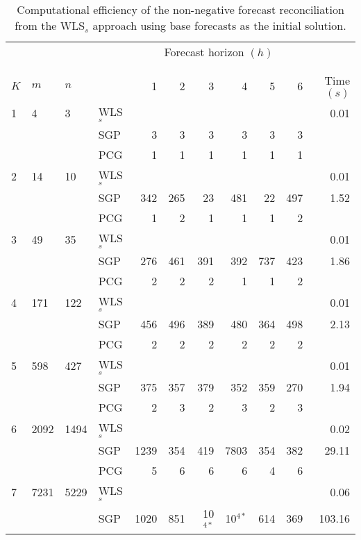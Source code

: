 \documentclass[twocolumn]{svjour3}
\begin{document}
\begin{table*}[ht]
\small
\tabcolsep=0.20cm
\caption{Computational efficiency of the non-negative forecast reconciliation from the WLS$_{s}$ approach using base forecasts as the initial solution.}
\label{tbl:perfnnwlsb}
\centering
\begin{threeparttable}
	\begin{tabular}{llllrrrrrrr}
		\toprule
		& & & & \multicolumn{6}{c}{Forecast horizon $(h)$} \\[-0.3cm]\\\cline{5-10}\\[-0.3cm]
		$K$ & $m$ & $n$ & & 1 & 2 & 3 & 4 & 5 & 6 & Time $(s)$ \\
		\midrule
		1 & 4 & 3 & WLS$_{s}$ & & & & & & & 0.01\\
		& & & SGP & 3 & 3 & 3 & 3 & 3 & 3 & \bm{$0.04$}\\
		& & & PCG & 1 & 1 & 1 & 1 & 1 & 1 & \bm{$0.04$}\\
		\midrule
		2 & 14 & 10 & WLS$_{s}$ & & & & & & & 0.01\\
		& & & SGP & 342 & 265 & 23 & 481 & 22  & 497 & 1.52 \\
		& & & PCG & 1 & 2 & 1 & 1 & 1 & 2 & \bm{$0.10$} \\
		\midrule
		3 & 49 & 35 & WLS$_{s}$ & & & & & & & 0.01 \\
		& & & SGP & 276 & 461 & 391 & 392 & 737 & 423 & 1.86\\
		& & & PCG & 2 & 2 & 2 & 1 & 1 & 2 & \bm{$0.17$}\\
		\midrule
		4 & 171 & 122 & WLS$_{s}$ & & & & & & & 0.01 \\
		& & & SGP & 456 & 496 & 389 & 480 & 364 & 498 & 2.13\\
		& & & PCG & 2 & 2 & 2 & 2 & 2 & 2 & \bm{$0.29$}\\
		\midrule
		5 & 598 & 427 & WLS$_{s}$ & & & & & & & 0.01\\
		& & & SGP & 375 & 357 & 379 & 352 & 359 & 270 & 1.94 \\
		& & & PCG & 2 & 3 & 2 & 3 & 2 & 3 & \bm{$0.33$} \\
		\midrule
		6 & 2092 & 1494 & WLS$_{s}$ & & & & & & & 0.02 \\
		& & & SGP & 1239 & 354 & 419 & 7803 & 354 & 382 & 29.11 \\
		& & & PCG & 5 & 6 & 6 & 6 & 4 & 6 & \bm{$0.51$} \\
		\midrule
		7 & 7231 & 5229 & WLS$_{s}$ & & & & & & & 0.06 \\
		& & & SGP & 1020 & 851 & 10$^{4*}$ & 10$^{4*}$ & 614 & 369 & 103.16 \\

\end{tabular}
\end{threeparttable}
\end{table*}
\end{document}
